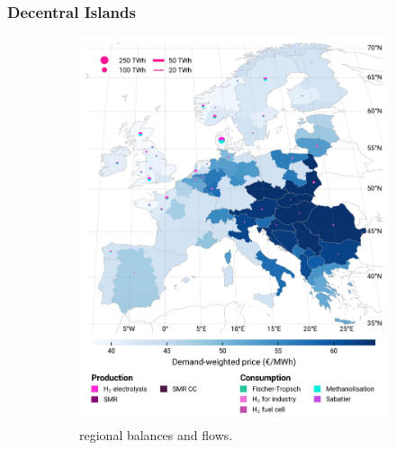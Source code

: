 \documentclass[preprint,12pt,sort&compress]{elsarticle}
\begin{document}
\subsubsection{Decentral Islands}
\begin{figure}[htbp]
  \centering
  \begin{subfigure}[t]{0.49\textwidth}
      \vspace{0pt}
      \includegraphics[width=1\textwidth]{maps/no-pipelines-no-pcipmi/base_s_adm___2030-balance_map_H2}
      \vspace{-0.5cm}
      \caption{ regional balances and flows.}
      \label{fig:DI_lt_2030_h2}
  \end{subfigure}
  \hfill
  \begin{subfigure}[t]{0.49\textwidth}
      \vspace{0pt}

\end{subfigure}
\end{figure}
\end{document}
